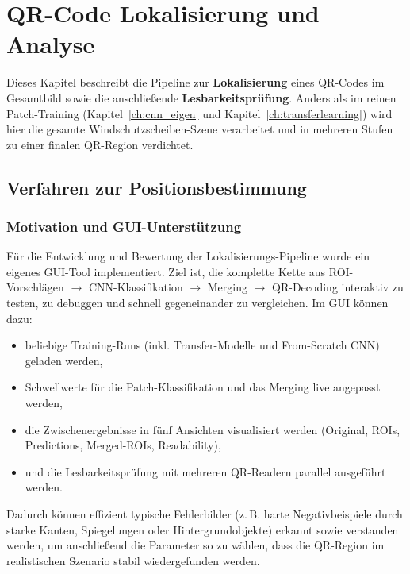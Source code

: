 \chapter{QR-Code Lokalisierung und Analyse}
\label{ch:qr_localization}

Dieses Kapitel beschreibt die Pipeline zur \textbf{Lokalisierung} eines \ac{QR}-Codes im Gesamtbild sowie die anschließende \textbf{Lesbarkeitsprüfung}. Anders als im reinen Patch-Training (Kapitel~\ref{ch:cnn_eigen} und Kapitel~\ref{ch:transferlearning}) wird hier die gesamte Windschutzscheiben-Szene verarbeitet und in mehreren Stufen zu einer finalen \ac{QR}-Region verdichtet.

\section{Verfahren zur Positionsbestimmung}
\label{sec:pos_bestimmung}

\subsection{Motivation und GUI-Unterstützung}
\label{subsec:gui_motivation}

Für die Entwicklung und Bewertung der Lokalisierungs-Pipeline wurde ein eigenes \ac{GUI}-Tool implementiert. Ziel ist, die komplette Kette aus \ac{ROI}-Vorschlägen $\rightarrow$ \ac{CNN}-Klassifikation $\rightarrow$ Merging $\rightarrow$ \ac{QR}-Decoding interaktiv zu testen, zu debuggen und schnell gegeneinander zu vergleichen. Im \ac{GUI} können dazu:
\begin{itemize}
    \item beliebige Training-Runs (inkl. Transfer-Modelle und From-Scratch \ac{CNN}) geladen werden,
    \item Schwellwerte für die Patch-Klassifikation und das Merging live angepasst werden,
    \item die Zwischenergebnisse in fünf Ansichten visualisiert werden (Original, \ac{ROI}s, Predictions, Merged-\ac{ROI}s, Readability),
    \item und die Lesbarkeitsprüfung mit mehreren \ac{QR}-Readern parallel ausgeführt werden.
\end{itemize}
Dadurch können effizient typische Fehlerbilder (z.\,B. harte Negativbeispiele durch starke Kanten, Spiegelungen oder Hintergrundobjekte) erkannt sowie verstanden werden, um anschließend die Parameter so zu wählen, dass die \ac{QR}-Region im realistischen Szenario stabil wiedergefunden werden.

